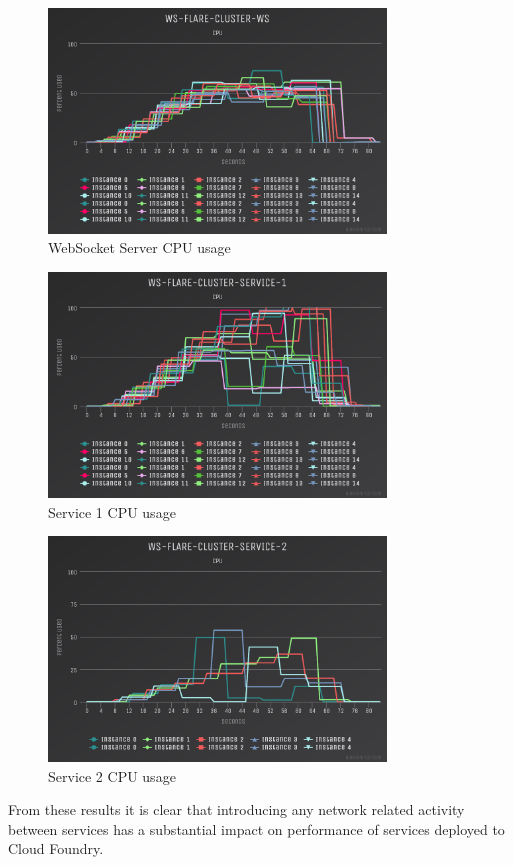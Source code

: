 \begin{figure}[H]
  \centering
    \includegraphics[width=0.8\textwidth]{figures/experiments/experiment-2/10000/ws-cpu-10000.png}
    \caption{WebSocket Server CPU usage}
    \label{fig:experiment-2-ws-cpu-10000}
\end{figure}

\begin{figure}[H]
  \centering
    \includegraphics[width=0.8\textwidth]{figures/experiments/experiment-2/10000/service1-cpu-10000.png}
    \caption{Service 1 CPU usage}
    \label{fig:experiment-2-service-1-cpu-10000}
\end{figure}

\begin{figure}[H]
  \centering
    \includegraphics[width=0.8\textwidth]{figures/experiments/experiment-2/10000/service2-cpu-10000.png}
    \caption{Service 2 CPU usage}
    \label{fig:experiment-2-service-2-cpu-10000}
\end{figure}

From these results it is clear that introducing any network related activity between services has a substantial impact on performance of services deployed to Cloud Foundry.